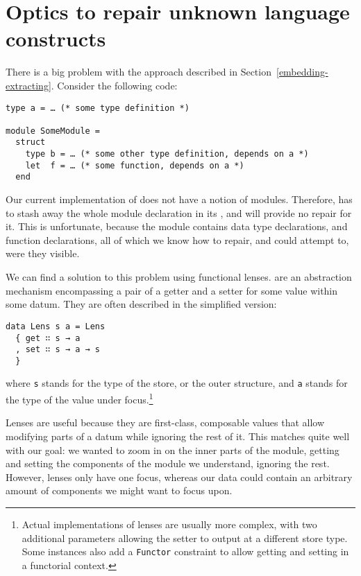 \section{Optics to repair unknown language constructs}\label{coop-optics}

There is a big problem with the approach described in
Section~\ref{embedding-extracting}.  Consider the following \OCaml{} code:

\begin{verbatim}
type a = … (* some type definition *)

module SomeModule =
  struct
    type b = … (* some other type definition, depends on a *)
    let  f = … (* some function, depends on a *)
  end
\end{verbatim}

Our current implementation of \Chick{} does not have a notion of modules.
Therefore, \Coop{} has to stash away the whole module declaration in its
, and will provide no repair for it.  This is
unfortunate, because the module contains data type declarations, and function
declarations, all of which we know how to repair, and could attempt to, were
they visible.

We can find a solution to this problem using functional lenses.  
are an abstraction mechanism encompassing a pair of a getter and a setter for
some value within some datum.  They are often described in the simplified
version:

\begin{verbatim}
data Lens s a = Lens
  { get ∷ s → a
  , set ∷ s → a → s
  }
\end{verbatim}

\noindent where \texttt{s} stands for the type of the store, or the
outer structure, and \texttt{a} stands for the type of the value
under focus.\footnote{Actual implementations of lenses are usually more complex,
with two additional parameters allowing the setter to output at a different
store type. Some instances also add a \texttt{Functor} constraint
to allow getting and setting in a functorial context.}

Lenses are useful because they are first-class, composable values that allow
modifying parts of a datum while ignoring the rest of it.  This matches quite
well with our goal: we wanted to zoom in on the inner parts of the module,
getting and setting the components of the module we understand, ignoring the
rest.  However, lenses only have one focus, whereas our data could contain
an arbitrary amount of components we might want to focus upon.

